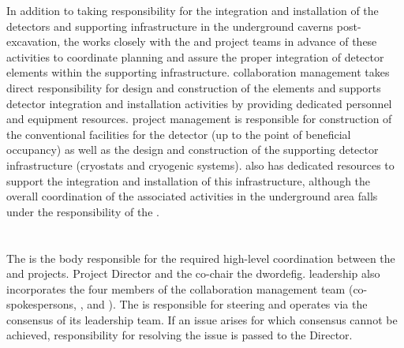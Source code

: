 In addition to taking responsibility for the integration and
installation of the detectors and supporting 
infrastructure in the underground caverns post-excavation, the
 works closely with the  and 
project teams in advance of these activities to coordinate planning
and assure the proper integration of detector elements within the
supporting infrastructure.   collaboration management
takes direct responsibility for design and construction of the  
 elements and supports detector integration and installation
activities by providing dedicated personnel and equipment resources.
 project management is responsible for construction of the
conventional  facilities for the detector (up to the point of beneficial  %
occupancy) as well as the design and construction of the supporting
detector infrastructure (cryostats and cryogenic systems).  also
has dedicated resources to support the integration and installation of
this infrastructure, although the overall coordination of the
associated activities in the underground area falls under the
responsibility of the .

\section{}
\label{sec:efig}

The  is the body responsible for the required high-level
coordination between the  and  projects.  
  Project Director and
the  co-chair the dword{efig}.   leadership also incorporates the four
members of the  collaboration management team
(co-spokespersons, , and ).  The
 is responsible for steering  and
operates via the consensus of its leadership team.  If an issue arises
for which consensus cannot be achieved, responsibility for resolving
the issue is passed to the  Director.

\section{}
\label{sec:jpo}

